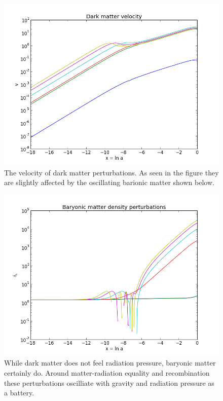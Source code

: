 \documentclass[norsk,a4paper,12pt]{article}
\begin{document}
\begin{figure}[H] 
\begin{center} 
\includegraphics[scale=0.5]{v_log.png} 
 

\caption{The velocity of dark matter perturbations. As seen in the figure they are slightly affected by the oscillating barionic matter shown below.} 
\end{center} 
\end{figure}




\begin{figure}[H] 
\begin{center} 
\includegraphics[scale=0.5]{delta_b.png} 
 

\caption{While dark matter does not feel radiation pressure, baryonic matter certainly do. Around matter-radiation equality and recombination these perturbations oscilliate with gravity and radiation pressure as a battery.} 
\end{center} 
\end{figure}
\end{document}
